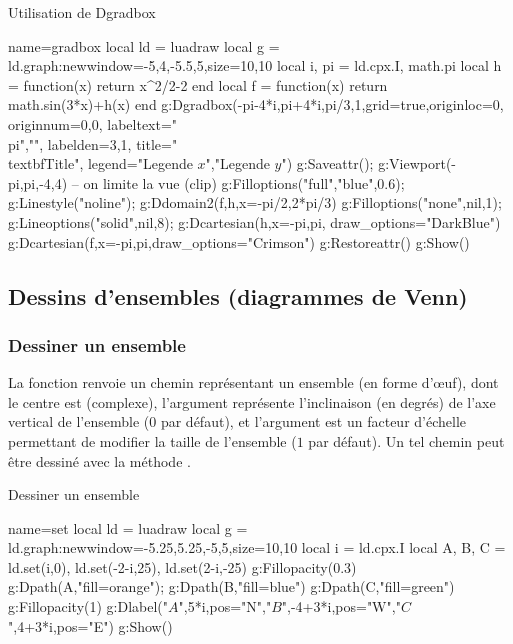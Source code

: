 \begin{demo}{Utilisation de Dgradbox}
\begin{luadraw}{name=gradbox}
local ld = luadraw
local g = ld.graph:new{window={-5,4,-5.5,5},size={10,10}}
local i, pi = ld.cpx.I, math.pi
local h = function(x) return x^2/2-2 end
local f = function(x) return math.sin(3*x)+h(x) end
g:Dgradbox({-pi-4*i,pi+4*i,pi/3,1},{grid=true,originloc=0, originnum={0,0}, labeltext={"\\pi",""},
labelden={3,1}, title="\\textbf{Title}", legend={"Legende $x$","Legende $y$"}})
g:Saveattr(); g:Viewport(-pi,pi,-4,4) -- on limite la vue (clip)
g:Filloptions("full","blue",0.6); g:Linestyle("noline"); g:Ddomain2(f,h,{x={-pi/2,2*pi/3}})
g:Filloptions("none",nil,1); g:Lineoptions("solid",nil,8); g:Dcartesian(h,{x={-pi,pi}, draw_options="DarkBlue"})
g:Dcartesian(f,{x={-pi,pi},draw_options="Crimson"})
g:Restoreattr()
g:Show()
\end{luadraw}
\end{demo}

\subsection{Dessins d'ensembles (diagrammes de Venn)}

\subsubsection{Dessiner un ensemble}

La fonction  renvoie un chemin représentant un ensemble (en forme d'œuf), dont le centre est  (complexe), l'argument  représente l'inclinaison (en degrés) de l'axe vertical de l'ensemble ($0$ par défaut), et l'argument  est un facteur d'échelle permettant de modifier la taille de l'ensemble ($1$ par défaut). Un tel chemin peut être dessiné avec la méthode .

\begin{demo}{Dessiner un ensemble}
\begin{luadraw}{name=set}
local ld = luadraw
local g = ld.graph:new{window={-5.25,5.25,-5,5},size={10,10}}
local i = ld.cpx.I
local A, B, C = ld.set(i,0), ld.set(-2-i,25), ld.set(2-i,-25)
g:Fillopacity(0.3)
g:Dpath(A,"fill=orange"); g:Dpath(B,"fill=blue")
g:Dpath(C,"fill=green")
g:Fillopacity(1)
g:Dlabel("$A$",5*i,{pos="N"},"$B$",-4+3*i,{pos="W"},"$C$",4+3*i,{pos="E"})
g:Show()
\end{luadraw}
\end{demo}

